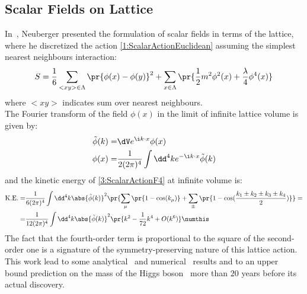 \subsection{Scalar Fields on \spFtext Lattice}
In~\cite{Neuberger:1987kt}, Neuberger presented the formulation of scalar fields in terms of the \spFtext lattice, where he discretized the action \eqref{1:ScalarActionEuclidean} assuming the simplest nearest neighbours interaction:
\begin{equation}
    S = \frac16\sum_{<xy>\in\Lambda}\pr{\phi(x)-\phi(y)}^2 +\sum_{x\in\Lambda}\pr{\frac12m^2\phi^2(x)+\frac\lambda4\phi^4(x)} \label{3:ScalarActionF4}
\end{equation}
where $<xy>$ indicates sum over nearest neighbours.\\
The Fourier transform of the field $\phi(x)$ in the limit of infinite lattice volume is given by:
\begin{align*}
    \tilde\phi(k) =& \dV e^{\i k \cdot x} \phi(x) \\
    \phi(x) =& \frac1{2(2\pi)^4} \int\dd^4k e^{-\i k \cdot x} \tilde\phi(k)
\end{align*}
and the kinetic energy of \eqref{3:ScalarActionF4} at infinite volume is:
\begin{align*}
    \text{K.E.} =& \frac1{6(2\pi)^4} \int\dd^4k \abs{\tilde\phi(k)}^2\pr{\sum_\mu\pr{1-\cos(k_\mu)} +\sum_\pm\pr{1-\cos(\frac{k_1\pm k_2\pm k_3\pm k_4}{2})}} =\\
    =& \frac{1}{12(2\pi)^4} \int\dd^4k \abs{\tilde\phi(k)}^2\pr{k^2-\frac{1}{72}k^4+O(k^6)} \numthis\label{3:ScalarKE}
\end{align*}
The fact that the fourth-order term is proportional to the square of the second-order one is a signature of the symmetry-preserving nature of this lattice action.\\
This work lead to some analytical~\cite{Bhanot:1990zd} and numerical~\cite{Bhanot:1990ai} results and to an upper bound prediction on the mass of the Higgs boson~\cite{Heller:1990sg} more than $20$ years before its actual discovery.

